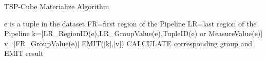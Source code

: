 {\renewcommand\baselinestretch{1} 

\begin{algorithm}[H]
\caption{TSP-Cube Materialize Algorithm}
\label{tscube_mr2}
{\fontfamily{\familydefault}\selectfont

	\begin{algorithmic}[1] %
    	\State e is a tuple in the dataset
    		\State FR=first region of the Pipeline
    		\State LR=last region of the Pipeline
        	\State k=[LR\_RegionID(e),LR\_GroupValue(e),TupleID(e) or MeasureValue(e)]
        	\State v=[FR\_GroupValue(e)]
        	\State EMIT([k],[v])
        \EndFor
   	 \EndFunction
   	 \State
     			\State
     			CALCULATE corresponding group and EMIT result
     		\EndIf
     	\EndFor
     \EndFunction
	\end{algorithmic}	
}
\end{algorithm}

\par}









